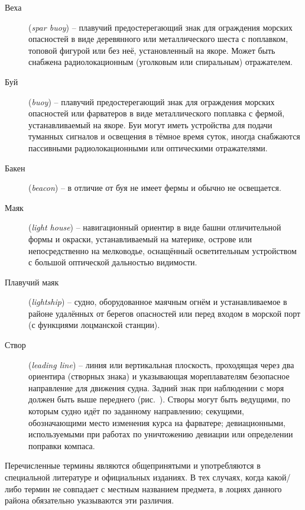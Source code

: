 \begin{description}
\item [Веха] (\textit{spar buoy}) \--- плавучий
  предостерегающий знак для ограждения морских опасностей в виде
  деревянного или металлического шеста с поплавком, топовой фигурой
  или без неё, установленный на якоре. Может быть снабжена
  радиолокационным (уголковым или спиральным) отражателем.
\item [Буй] (\textit{buoy}) \--- плавучий предостерегающий знак для
  ограждения морских опасностей или фарватеров в виде металлического
  поплавка с фермой, устанавливаемый на якоре. Буи могут иметь
  устройства для подачи туманных сигналов и освещения в тёмное время
  суток, иногда снабжаются пассивными радиолокационными или
  оптическими отражателями.
\item [Бакен] (\textit{beacon}) \--- в
  отличие от буя не имеет фермы и обычно не освещается.
\item [Маяк] (\textit{light house})
  \--- навигационный ориентир в виде башни отличительной формы и
  окраски, устанавливаемый на материке, острове или непосредственно на
  мелководье, оснащённый осветительным устройством с большой
  оптической дальностью видимости.
\item [Плавучий маяк]
  (\textit{lightship}) \---
  судно, оборудованное маячным огнём и устанавливаемое в районе
  удалённых от берегов опасностей или перед входом в морской порт (с
  функциями лоцманской станции).
\item [Створ] (\textit{leading line})
  \--- линия или вертикальная плоскость, проходящая через два
  ориентира (створных знака) и указывающая мореплавателям безопасное
  направление для движения судна. Задний знак при наблюдении с моря
  должен быть выше переднего (рис.~). Створы могут быть
  ведущими, по которым судно идёт по заданному направлению; секущими,
  обозначающими место изменения курса на фарватере; девиационными,
  используемыми при работах по уничтожению девиации или определении
  поправки компаса.
\end{description}

Перечисленные термины являются общепринятыми и употребляются в
специальной литературе и официальных изданиях. В тех случаях, когда
какой\-/либо термин не совпадает с местным названием предмета, в
лоциях данного района обязательно указываются эти различия.

